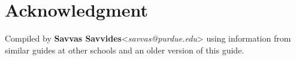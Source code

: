 \section{Acknowledgment}
Compiled by \textbf{Savvas Savvides}<\emph{savvas@purdue.edu}> using information from similar guides at other schools and an older version of this guide.